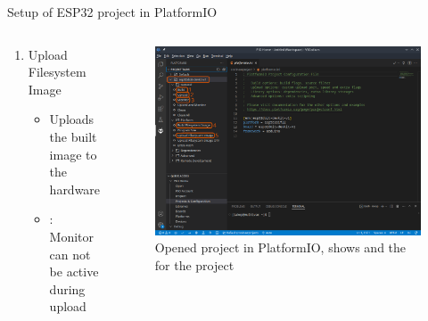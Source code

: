 \documentclass[aspectratio=169]{beamer}
\begin{document}
\begin{frame}{Setup of ESP32 project in PlatformIO}
\begin{columns}
\begin{column}{0.5\textwidth}
\begin{textBox}
\begin{itemize}
\begin{enumerate}
					\item Upload Filesystem Image
					\begin{itemize}
						\item Uploads the built image to the hardware
						\item {}: Monitor can not be active during upload
					\end{itemize}
				\end{enumerate}
			\end{itemize}
		\end{textBox}
	\end{column}
	\begin{column}{0.5\textwidth}
		\begin{figure}
  			\includegraphics[width=\textwidth,keepaspectratio=true]{assets/pictures/pio-project-3.png}
  			\caption{Opened project in PlatformIO, shows  and the  for the project}
  			\label{fig:pio-project3}
		\end{figure}
	\end{column}
\end{columns}
\end{frame}
\end{document}
